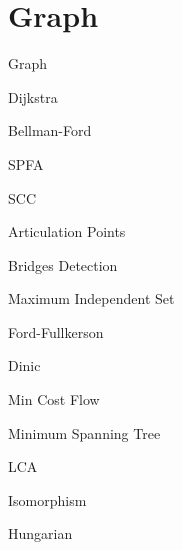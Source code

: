 \section{Graph}

Graph


Dijkstra


Bellman-Ford


SPFA


SCC


Articulation Points


Bridges Detection


Maximum Independent Set


Ford-Fullkerson


Dinic


Min Cost Flow


Minimum Spanning Tree


LCA


Isomorphism


Hungarian

